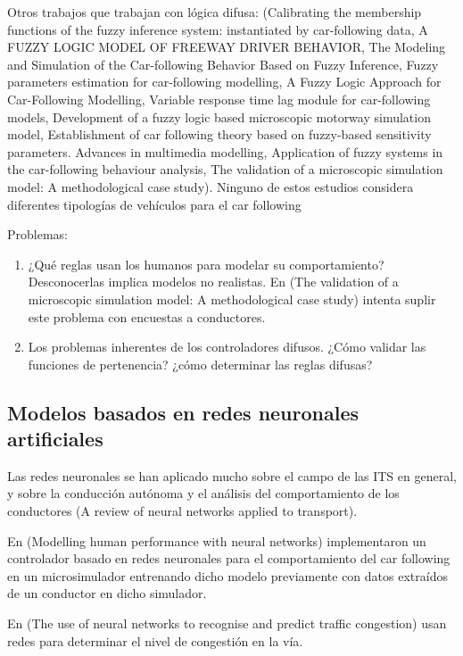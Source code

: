Otros trabajos que trabajan con lógica difusa: (Calibrating the membership functions of the fuzzy inference system: instantiated by car-following data, A FUZZY LOGIC MODEL OF FREEWAY DRIVER BEHAVIOR, The Modeling and Simulation of the Car-following Behavior Based on Fuzzy Inference, Fuzzy parameters estimation for car-following modelling, A Fuzzy Logic Approach for Car-Following Modelling, Variable response time lag module for car-following models, Development of a fuzzy logic based microscopic motorway simulation model, Establishment of car following theory based on fuzzy-based sensitivity parameters. Advances in multimedia modelling, Application of fuzzy systems in the car-following behaviour analysis, The validation of a microscopic simulation model: A methodological case study). Ninguno de estos estudios considera diferentes tipologías de vehículos para el car following

Problemas:

\begin{enumerate}
	\item ¿Qué reglas usan los humanos para modelar su comportamiento? Desconocerlas implica modelos no realistas. En (The validation of a microscopic simulation model: A methodological case study) intenta suplir este problema con encuestas a conductores.
	\item Los problemas inherentes de los controladores difusos. ¿Cómo validar las funciones de pertenencia? ¿cómo determinar las reglas difusas?
\end{enumerate}

\subsection{Modelos basados en redes neuronales artificiales}

Las redes neuronales se han aplicado mucho sobre el campo de las ITS en general, y sobre la conducción autónoma y el análisis del comportamiento de los conductores (A review of neural networks applied to transport).

En (Modelling human performance with neural networks) implementaron un controlador basado en redes neuronales para el comportamiento del car following en un microsimulador entrenando dicho modelo previamente con datos extraídos de un conductor en dicho simulador.

En (The  use  of  neural  networks  to  recognise  and
predict traffic congestion) usan redes para determinar el nivel de congestión en la vía.

